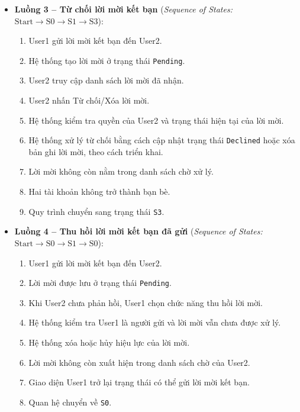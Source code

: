 \documentclass[11pt,a4paper]{article}
\begin{document}
\begin{itemize}[leftmargin=1.2cm, noitemsep]
    \item[\textbf{--}] \textbf{Luồng 3 -- Từ chối lời mời kết bạn} (\textit{Sequence of States:} $\text{Start} \rightarrow \text{S0} \rightarrow \text{S1} \rightarrow \text{S3}$):
    \begin{enumerate}[leftmargin=0.7cm, noitemsep]
        \item User1 gửi lời mời kết bạn đến User2.
        \item Hệ thống tạo lời mời ở trạng thái \texttt{Pending}.
        \item User2 truy cập danh sách lời mời đã nhận.
        \item User2 nhấn Từ chối/Xóa lời mời.
        \item Hệ thống kiểm tra quyền của User2 và trạng thái hiện tại của lời mời.
        \item Hệ thống xử lý từ chối bằng cách cập nhật trạng thái \texttt{Declined} hoặc xóa bản ghi lời mời, theo cách triển khai.
        \item Lời mời không còn nằm trong danh sách chờ xử lý.
        \item Hai tài khoản không trở thành bạn bè.
        \item Quy trình chuyển sang trạng thái \texttt{S3}.
    \end{enumerate}

    \item[\textbf{--}] \textbf{Luồng 4 -- Thu hồi lời mời kết bạn đã gửi} (\textit{Sequence of States:} $\text{Start} \rightarrow \text{S0} \rightarrow \text{S1} \rightarrow \text{S0}$):
    \begin{enumerate}[leftmargin=0.7cm, noitemsep]
        \item User1 gửi lời mời kết bạn đến User2.
        \item Lời mời được lưu ở trạng thái \texttt{Pending}.
        \item Khi User2 chưa phản hồi, User1 chọn chức năng thu hồi lời mời.
        \item Hệ thống kiểm tra User1 là người gửi và lời mời vẫn chưa được xử lý.
        \item Hệ thống xóa hoặc hủy hiệu lực của lời mời.
        \item Lời mời không còn xuất hiện trong danh sách chờ của User2.
        \item Giao diện User1 trở lại trạng thái có thể gửi lời mời kết bạn.
        \item Quan hệ chuyển về \texttt{S0}.
    \end{enumerate}


\end{itemize}
\end{document}
